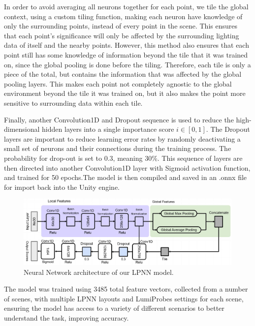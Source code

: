 In order to avoid averaging all neurons together for each point, we tile the global context, using a custom tiling function, making each neuron have knowledge of only the surrounding points, instead of every point in the scene. This ensures that each point's significance will only be affected by the surrounding lighting data of itself and the nearby points. However, this method also ensures that each point still has some knowledge of information beyond the tile that it was trained on, since the global pooling is done before the tiling. Therefore, each tile is only a piece of the total, but contains the information that was affected by the global pooling layers. This makes each point not completely agnostic to the global environment beyond the tile it was trained on, but it also makes the point more sensitive to surrounding data within each tile.

Finally, another Convolution1D and Dropout sequence is used to reduce the high-dimensional hidden layers into a single importance score $i \in [0,1]$. The Dropout layers are important to reduce learning error rates by randomly deactivating a small set of neurons and their connections during the training process. The probability for drop-out is set to 0.3, meaning 30\%. This sequence of layers are then directed into another Convolution1D layer with Sigmoid activation function, and trained for 50 epochs.The model is then compiled and saved in an .onnx file for import back into the Unity engine.

\begin{figure}[h]
	\centering
	\includegraphics[width=\linewidth]{Graphics/LPNN.jpg}
	\caption{Neural Network architecture of our LPNN model.}
	\label{fig:LPNN_arch}
\end{figure}

The model was trained using 3485 total feature vectors, collected from a number of scenes, with multiple LPNN layouts and LumiProbes settings for each scene, ensuring the model has access to a variety of different scenarios to better understand the task, improving accuracy.\newline

